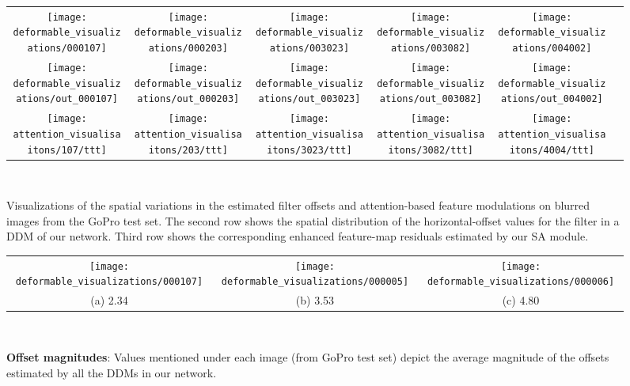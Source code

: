 \documentclass[letterpaper]{article} \usepackage{aaai20}  \usepackage{times}  \usepackage{helvet} \usepackage{courier}  \usepackage[hyphens]{url}  \usepackage{graphicx} \urlstyle{rm} \def\UrlFont{\rm}  \usepackage{graphicx}  \frenchspacing  \setlength{\pdfpagewidth}{8.5in}  \setlength{\pdfpageheight}{11in}
\begin{document}
\begin{figure*}[htb]
\begin{center}
\begin{tabular}{cccccc}
  \texttt{[image: deformable\_visualizations/000107]} &
  \texttt{[image: deformable\_visualizations/000203]} &
  \texttt{[image: deformable\_visualizations/003023]} &
  \texttt{[image: deformable\_visualizations/003082]} &
  \texttt{[image: deformable\_visualizations/004002]} \\
  \texttt{[image: deformable\_visualizations/out\_000107]}&
  \texttt{[image: deformable\_visualizations/out\_000203]} &
  \texttt{[image: deformable\_visualizations/out\_003023]} &
  \texttt{[image: deformable\_visualizations/out\_003082]} &
  \texttt{[image: deformable\_visualizations/out\_004002]} \\
    \texttt{[image: attention\_visualisaitons/107/ttt]}&
  \texttt{[image: attention\_visualisaitons/203/ttt]}&
  \texttt{[image: attention\_visualisaitons/3023/ttt]}&
  \texttt{[image: attention\_visualisaitons/3082/ttt]}&
  \texttt{[image: attention\_visualisaitons/4004/ttt]}\\
  \end{tabular}   \\
\end{center}
\vspace{-1.5mm}
\caption{Visualizations of the spatial variations in the estimated filter offsets and attention-based feature modulations on blurred images from the GoPro test set. The second row shows the spatial distribution of the horizontal-offset values for the filter in a DDM of our network. Third row shows the corresponding enhanced feature-map residuals estimated by our SA module.}
\label{fig:visualization_deformable}
\end{figure*}


\begin{figure}[htb]
\begin{center}
\begin{tabular}{ccc}
\texttt{[image: deformable\_visualizations/000107]} &
  \texttt{[image: deformable\_visualizations/000005]} &
  \texttt{[image: deformable\_visualizations/000006]} \\
    (a) 2.34 & (b) 3.53 & (c) 4.80 \\
\end{tabular}   \\
\end{center}
\vspace{-3mm}
  \caption{\textbf{Offset magnitudes}: Values mentioned under each image (from GoPro test set) depict the average magnitude of the offsets estimated by all the DDMs in our network.}  
\label{fig:deformable_magnitude}
\end{figure}
\end{document}
